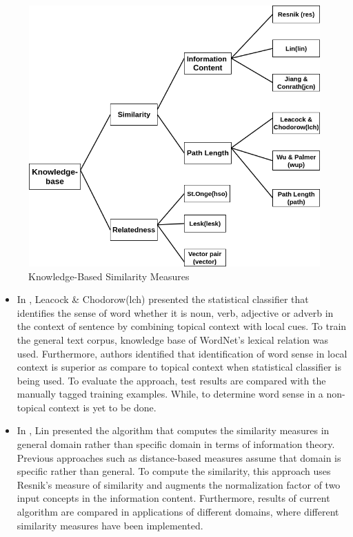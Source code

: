 \documentclass{article}
\begin{document}
\centering
\begin{figure}[h]
\includegraphics[width=12cm,height = 10cm]{knowledge_base.png}
\caption{Knowledge-Based Similarity Measures\cite{survey}}
\end{figure}
\begin{itemize}
\item In \cite{lch}, Leacock \& Chodorow(lch) presented the statistical classifier that identifies the sense of word whether it is noun, verb, adjective or adverb in the context of sentence by combining topical context with local cues. To train the general text corpus, knowledge base of WordNet's lexical relation was used. Furthermore, authors identified that identification of word sense in local context is superior as compare to topical context when statistical classifier is being used. To evaluate the approach, test results are compared with the manually tagged training examples. While, to determine word sense in a non-topical context is yet to be done.
\item In \cite{lin}, Lin presented the algorithm that computes the similarity measures in general domain rather than specific domain in terms of information theory. Previous approaches such as distance-based measures assume that domain is specific rather than general. To compute the similarity, this approach uses Resnik's measure\cite{resnik} of similarity and augments the normalization factor of two input concepts in the information content. Furthermore, results of current algorithm are compared in applications of different domains, where different similarity measures have been implemented.
\end{itemize}
\end{document}
